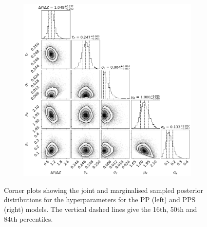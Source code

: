 \documentclass[a4paper,fleqn,usenatbib]{mnras}
\begin{document}
\begin{figure}
\begin{subfigure}[b]{.5\linewidth}
        \includegraphics[width=\textwidth]{figures/corner_plot_pps.png}
    \end{subfigure}
    \caption{Corner plots showing the joint and marginalised sampled posterior distributions for the hyperparameters for the PP (left) and PPS (right) models. The vertical dashed lines give the 16th, 50th and 84th percentiles.}
    \label{fig:corners-pp}
\end{figure} 
\end{document}
